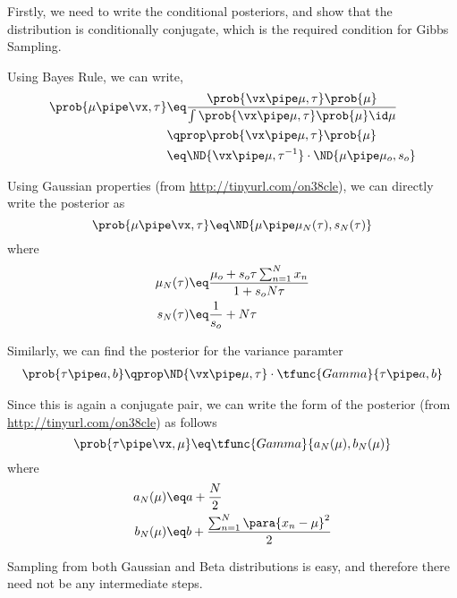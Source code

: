 \documentclass{article}
\begin{document}
\makeheader

\begin{question}

	Firstly, we need to write the conditional posteriors, and show that the distribution is conditionally conjugate, which is the required condition for Gibbs Sampling.

	Using Bayes Rule, we can write,
	\begin{align*}
		\prob{\mu \pipe \vx, \tau}	&\eq	\frac{\prob{\vx \pipe \mu, \tau} \prob{\mu}}{\int \prob{\vx \pipe \mu, \tau} \prob{\mu} \id \mu} \\
		&\qprop	\prob{\vx \pipe \mu, \tau} \prob{\mu} \\
		&\eq	\ND{\vx \pipe \mu, \tau^{-1}} \cdot \ND{\mu \pipe \mu_o, s_o}
	\end{align*}

	Using Gaussian properties (from \href{http://tinyurl.com/on38cle}{http://tinyurl.com/on38cle}), we can directly write the posterior as
	\begin{equation}
		\prob{\mu \pipe \vx, \tau} \eq \ND{\mu \pipe \mu_N(\tau), s_N(\tau)}
		\label{eq:q1-1}
	\end{equation}
	where
	\begin{align*}
		\mu_N(\tau)	&\eq	\frac{\mu_o + s_o \tau \sum_{n = 1}^N x_n}{1 + s_o N \tau} \\
		s_N(\tau)	&\eq	\frac{1}{s_o} + N \tau
	\end{align*}

	Similarly, we can find the posterior for the variance paramter
	\begin{align*}
		\prob{\tau \pipe a, b} \qprop \ND{\vx \pipe \mu, \tau} \cdot \tfunc{Gamma}{\tau \pipe a, b}
	\end{align*}

	Since this is again a conjugate pair, we can write the form of the posterior (from \href{http://tinyurl.com/on38cle}{http://tinyurl.com/on38cle}) as follows
	\begin{equation}
		\prob{\tau \pipe \vx, \mu} \eq \tfunc{Gamma}{a_N(\mu), b_N(\mu)}
		\label{eq:q1-2}
	\end{equation}
	where
	\begin{align*}
		a_N(\mu) &\eq a + \frac{N}{2} \\
		b_N(\mu) &\eq b + \frac{\sum_{n = 1}^N \para{x_n - \mu}^2}{2}
	\end{align*}

	\begin{note}
		Sampling from both Gaussian and Beta distributions is easy, and therefore there need not be any intermediate steps.
	\end{note}


\end{question}
\end{document}
